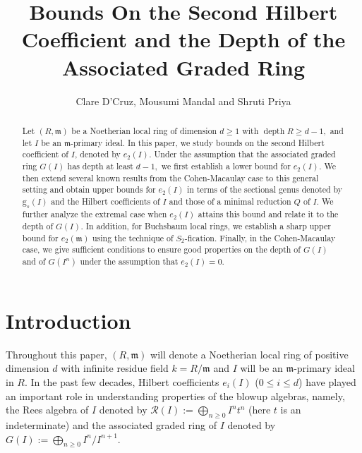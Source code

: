 \documentclass[reqno,a4paper,dvipsnames]{amsart}
\title[Bounds On the Second Hilbert Coefficient and the Depth of the Associated Graded Ring] {Bounds On the Second Hilbert Coefficient and the Depth of the Associated Graded Ring}
\author{Clare D'Cruz, Mousumi Mandal and Shruti Priya }
\date{}
\newcommand{\m}{\mathfrak{m} }
\newcommand{\depth}{\operatorname{depth}}
\theoremstyle{definition}
\begin{document}
\allowdisplaybreaks
\begin{abstract}
Let $(R, \m)$ be a  Noetherian local ring    of dimension $d \geq 1$ with $\depth R \geq d-1,$ and let $I$ be an $\m$-primary ideal. In this paper, 
we study bounds on the second Hilbert coefficient of $I$, denoted  by  $e_{2}(I)$.  Under the assumption that the associated graded ring $G(I)$ has depth at least $d-1,$ we first establish a lower bound for $e_{2}(I).$ We then extend several known results   
 from the Cohen-Macaulay case to this general setting and  obtain upper bounds for $e_{2}(I)$ in terms of the sectional genus denoted by $\mathrm{g}_{s}(I)$ and the Hilbert coefficients of $I$ and those of a minimal reduction $Q$ of $I$. 
 We further analyze the extremal case when $e_{2}(I)$ attains this bound and relate it to the  depth of $G(I)$.  
 In addition, for Buchsbaum local rings, we establish a sharp upper bound for $e_{2}(\m)$ using the technique of $S_{2}$-fication. 
 Finally, in the Cohen-Macaulay case, we give sufficient conditions to ensure good properties on the depth of $G(I)$ and  of $G(I^n)$ under the assumption that $e_{2}(I)=0$.
\end{abstract}
\maketitle
\section{Introduction}
Throughout this paper, $(R,\m)$  will denote   a Noetherian local ring of positive  dimension $d$ with infinite residue field $k=R/\m$ and $I$ will be  an $\m$-primary ideal  in $R$. In the past few decades, Hilbert coefficients $e_i(I)$ ($0 \leq i \leq d$) have played an important role in understanding  properties of the blowup algebras, namely,  the Rees algebra of $I$ denoted by $\mathcal{R}(I):=\displaystyle \bigoplus_{n \geq 0}I^{n}t^{n}$ (here $t$ is an indeterminate) and the associated graded ring of $I$ denoted by $G(I):=\displaystyle \bigoplus_{n \geq 0}I^{n}/I^{n+1}$.   
\end{document}
